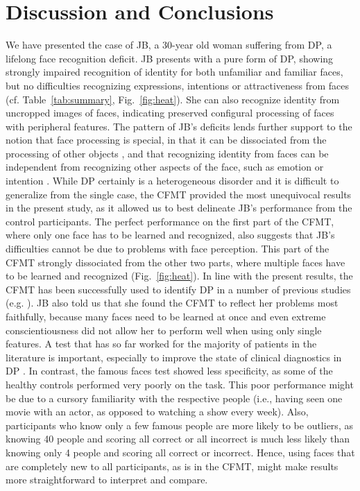 \documentclass[fleqn,10pt]{SelfArx} %
\begin{document}
\section{Discussion and Conclusions}

We have presented the case of JB, a 30-year old woman suffering from DP, a lifelong face recognition deficit. JB presents with a pure form of DP, showing strongly impaired recognition of identity for both unfamiliar and familiar faces, but no difficulties recognizing expressions, intentions or attractiveness from faces (cf. Table~\ref{tab:summary}, Fig.~\ref{fig:heat}). She can also recognize identity from uncropped images of faces, indicating preserved configural processing of faces with peripheral features.
The pattern of JB's deficits lends further support to the notion that face processing is special, in that it can be dissociated from the processing of other objects \citep{McKone_2011}, and that recognizing identity from faces can be independent from recognizing other aspects of the face, such as emotion or intention \citep{Haxby_2000, Calder_2005}.
While DP certainly is a heterogeneous disorder \citep{Duchaine_2006curr, Le_Grand_2006} and it is difficult to generalize from the single case, the CFMT provided the most unequivocal results in the present study, as it allowed us to best delineate JB's performance from the control participants. The perfect performance on the first part of the CFMT, where only one face has to be learned and recognized, also suggests that JB’s difficulties cannot be due to problems with face perception. This part of the CFMT strongly dissociated from the other two parts, where multiple faces have to be learned and recognized (Fig.~\ref{fig:heat}). In line with the present results, the CFMT has been successfully used to identify DP in a number of previous studies (e.g. \citet{Duchaine_2006cfmt, Duchaine_2006cog}). JB also told us that she found the CFMT to reflect her problems most faithfully, because many faces need to be learned at once and even extreme conscientiousness did not allow her to perform well when using only single features. A test that has so far worked for the majority of patients in the literature is important, especially to improve the state of clinical diagnostics in DP \citep{Shah_2016, Bate_2017}.
In contrast, the famous faces test showed less specificity, as some of the healthy controls performed very poorly on the task. This poor performance might be due to a cursory familiarity with the respective people (i.e., having seen one movie with an actor, as opposed to watching a show every week). Also, participants who know only a few famous people are more likely to be outliers, as knowing 40 people and scoring all correct or all incorrect is much less likely than knowing only 4 people and scoring all correct or incorrect. Hence, using faces that are completely new to all participants, as is in the CFMT, might make results more straightforward to interpret and compare.
\end{document}
